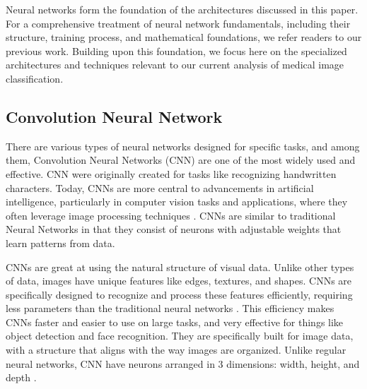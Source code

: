 
Neural networks form the foundation of the architectures discussed in this paper. For a comprehensive treatment of neural network fundamentals, including their structure, training process, and mathematical foundations, we refer readers to our previous work.\cite{Project2} Building upon this foundation, we focus here on the specialized architectures and techniques relevant to our current analysis of medical image classification.


\subsection{Convolution Neural Network}

There are various types of neural networks designed for specific tasks, and among them, Convolution Neural Networks (CNN) are one of the most widely used and effective. CNN were originally created for tasks like recognizing handwritten characters. Today, CNNs are more central to advancements in artificial intelligence, particularly in computer vision tasks and applications, where they often leverage image processing techniques \cite{CNN_aininsights}. CNNs are similar to traditional Neural Networks in that they consist of neurons with adjustable weights that learn patterns from data.




CNNs are great at using the natural structure of visual data. Unlike other types of data, images have unique features like edges, textures, and shapes. CNNs are specifically designed to recognize and process these features efficiently, requiring less parameters than the traditional neural networks \cite{CNN_aininsights}. This efficiency makes CNNs faster and easier to use on large tasks, and very effective for things like object detection and face recognition. They are specifically built for image data, with a structure that aligns with the way images are organized. Unlike regular neural networks, CNN have neurons arranged in 3 dimensions: width, height, and depth \cite{cs231n_cnn}.

